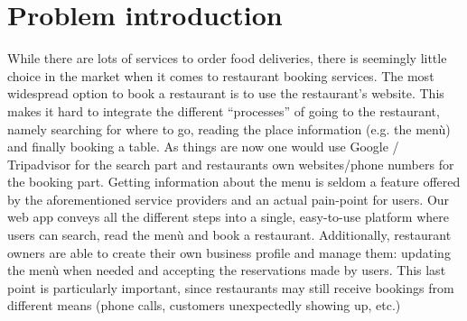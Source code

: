 \section{Problem introduction}
While there are lots of services to order food deliveries,
there is seemingly little choice in the market when it comes
to restaurant booking services. The most widespread option to
book a restaurant is to use the restaurant’s website. This
makes it hard to integrate the different “processes” of going to 
the restaurant, namely searching for where to go, reading the place 
information (e.g. the menù) and finally booking a table. As things are
now one would use Google / Tripadvisor for the search part and 
restaurants own websites/phone numbers for the booking part.
Getting information about the menu is seldom a feature offered by
the aforementioned service providers and an actual pain-point for users. 
Our web app conveys all the different steps into a single, easy-to-use
platform where users can search, read the menù and book a restaurant.
Additionally, restaurant owners are able to create their own business
profile and manage them: updating the menù when needed and accepting the
reservations made by users. This last point is particularly important,
since restaurants may still receive bookings from different means
(phone calls, customers unexpectedly showing up, etc.)
